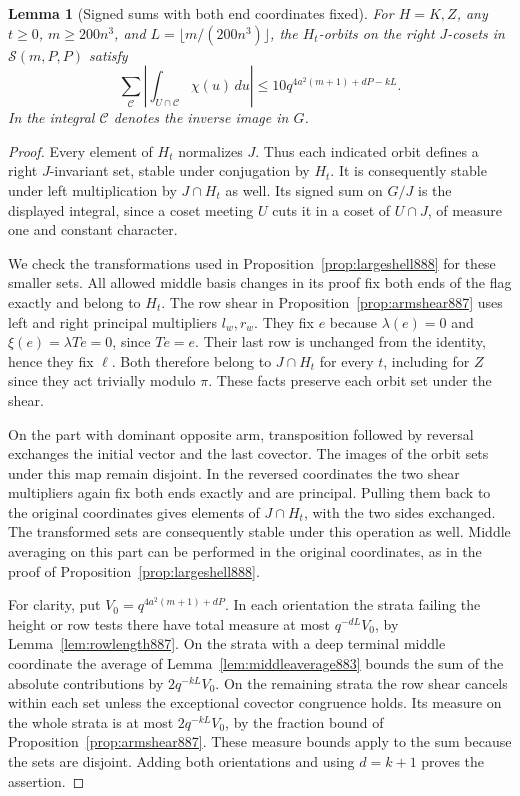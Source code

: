 \documentclass[a4paper,11pt]{article}
\newtheorem{lemma}[proposition]{Lemma}
\theoremstyle{definition}
\theoremstyle{remark}
\numberwithin{equation}{section}
\begin{document}
\begin{lemma}[Signed sums with both end coordinates fixed]
\leavevmode\label{lem:flagclass891}
For \(H=K,Z\), any \(t\ge0\), \(m\ge200n^3\), and
\(L=\lfloor m/(200n^3)\rfloor\), the \(H_t\)-orbits on the
right \(J\)-cosets in \(\mathcal S(m,P,P)\) satisfy
\[
 \sum_{\mathcal C}
    \left|\int_{U\cap\mathcal C}\chi(u)\,du\right|
       \le 10q^{4a^2(m+1)+dP-kL}.
\]
In the integral \(\mathcal C\) denotes the inverse image in \(G\).
\end{lemma}
\begin{proof}
Every element of \(H_t\) normalizes \(J\). Thus each indicated
orbit defines a right \(J\)-invariant set, stable under conjugation
by \(H_t\). It is consequently stable under left multiplication
by \(J\cap H_t\) as well. Its signed sum on \(G/J\) is the
displayed integral, since a coset meeting \(U\) cuts it in a
coset of \(U\cap J\), of measure one and constant character.

We check the transformations used in Proposition~\ref{prop:largeshell888}
for these smaller sets. All allowed middle basis changes in its
proof fix both ends of the flag exactly and belong to \(H_t\).
The row shear in Proposition~\ref{prop:armshear887} uses left
and right principal multipliers \(l_w,r_w\). They fix \(e\)
because \(\lambda(e)=0\) and \(\xi(e)=\lambda T e=0\), since
\(T e=e\). Their last row is unchanged from the identity, hence
they fix \(\ell\). Both therefore belong to \(J\cap H_t\) for
every \(t\), including for \(Z\) since they act trivially modulo
\(\pi\). These facts preserve each orbit set under the shear.

On the part with dominant opposite arm, transposition followed
by reversal exchanges the initial vector and the last covector.
The images of the orbit sets under this map remain disjoint.
In the reversed coordinates the two shear multipliers again fix
both ends exactly and are principal. Pulling them back to the
original coordinates gives elements of \(J\cap H_t\), with
the two sides exchanged. The transformed sets are consequently
stable under this operation as well. Middle averaging on this
part can be performed in the original coordinates, as in the
proof of Proposition~\ref{prop:largeshell888}.

For clarity, put \(V_0=q^{4a^2(m+1)+dP}\).
In each orientation the strata failing the height or row tests
there have total measure at most \(q^{-dL}V_0\), by
Lemma~\ref{lem:rowlength887}. On the strata with a deep terminal
middle coordinate the average of Lemma~\ref{lem:middleaverage883}
bounds the sum of the absolute contributions by \(2q^{-kL}V_0\).
On the remaining strata the row shear cancels within each set
unless the exceptional covector congruence holds. Its measure
on the whole strata is at most \(2q^{-kL}V_0\), by the fraction
bound of Proposition~\ref{prop:armshear887}. These measure bounds
apply to the sum because the sets are disjoint. Adding both
orientations and using \(d=k+1\) proves the assertion.
\end{proof}
\end{document}
